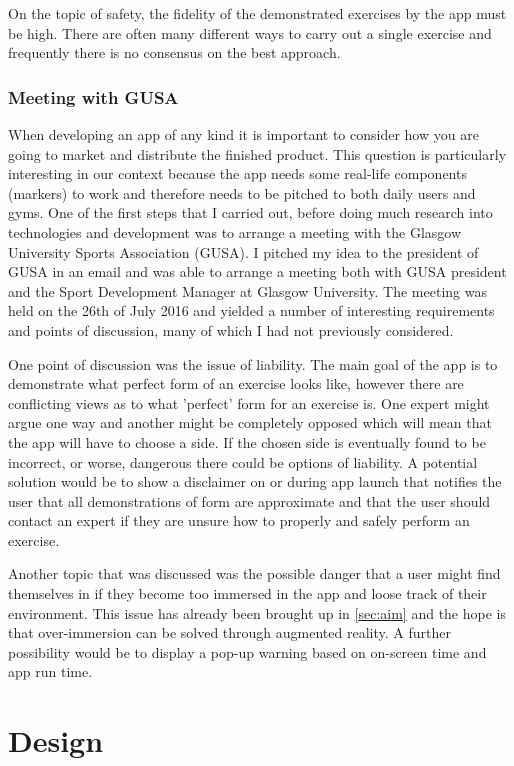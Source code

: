 \documentclass{l4proj}
\begin{document}
On the topic of safety, the fidelity of the demonstrated exercises by the app must be high. There are often many different ways to carry out a single exercise and frequently there is no consensus on the best approach.  
\subsection{Meeting with GUSA}
When developing an app of any kind it is important to consider how you are going to market and distribute the finished product. This question is particularly interesting in our context because the app needs some real-life components (markers) to work and therefore needs to be pitched to both daily users and gyms. One of the first steps that I carried out, before doing much research into technologies and development was to arrange a meeting with the Glasgow University Sports Association (GUSA). I pitched my idea to the president of GUSA in an email and was able to arrange a meeting both with GUSA president and the Sport Development Manager at Glasgow University. The meeting 	was held on the 26th of July 2016 and yielded a number of interesting requirements and points of discussion, many of which I had not previously considered. 

One point of discussion was the issue of liability. The main goal of the app is to demonstrate what perfect form of an exercise looks like, however there are conflicting views as to what 'perfect' form for an exercise is. One expert might argue one way and another might be completely opposed which will mean that the app will have to choose a side. If the chosen side is eventually found to be incorrect, or worse, dangerous there could be options of liability. A potential solution would be to show a disclaimer on or during app launch that notifies the user that all demonstrations of form are approximate and that the user should contact an expert if they are unsure how to properly and safely perform an exercise. 

Another topic that was discussed was the possible danger that a user might find themselves in if they become too immersed in the app and loose track of their environment. This issue has already been brought up in \ref{sec:aim} and the hope is that over-immersion can be solved through augmented reality. A further possibility would be to display a pop-up warning based on on-screen time and app run time. 



\chapter{Design}
\end{document}
